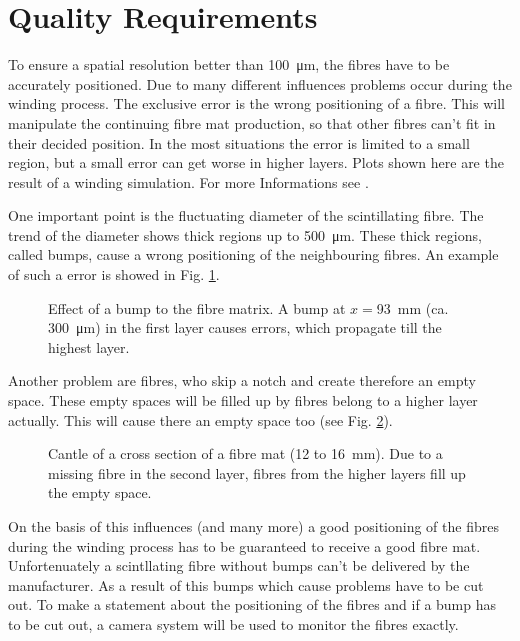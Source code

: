 \section{Quality Requirements}
\label{sec:QualityRequirements}

To ensure a spatial resolution better than \SI{100}{\micro\metre}, the fibres have to be accurately positioned. Due to many different influences problems occur during the winding process. The exclusive error is the wrong positioning of a fibre. This will manipulate the continuing fibre mat production, so that other fibres can't fit in their decided position. In the most situations the error is limited to a small region, but a small error can get worse in higher layers.
Plots shown here are the result of a winding simulation. For more Informations see \cite{WindingSimulation}.

One important point is the fluctuating diameter of the scintillating fibre. The trend of the diameter shows thick regions up to \SI{500}{\micro\metre}. These thick regions, called bumps, cause a wrong positioning of the neighbouring fibres. An example of such a error is showed in Fig. \ref{blob}.
\begin{figure}[tb]
\begin{center}
\caption[Effect of a bump to the fibre matrix.]{Effect of a bump to the fibre matrix. A bump at $x=$\SI{93}{\mm} (ca. \SI{300}{\micro\metre}) in the first layer causes errors, which propagate till the highest layer.\label{blob}}
\end{center}
\end{figure}

Another problem are fibres, who skip a notch and create therefore an empty space. These empty spaces will be filled up by fibres belong to a higher layer actually. This will cause there an empty space too (see Fig. \ref{missing}).
\begin{figure}[tb]
\begin{center}
\caption{Cantle of a cross section of a fibre mat (12 to \SI{16}{\mm}). Due to a missing fibre in the second layer, fibres from the higher layers fill up the empty space. \label{missing}}
\end{center}
\end{figure}

On the basis of this influences (and many more) a good positioning of the fibres during the winding process has to be guaranteed to receive a good fibre mat. Unfortenuately a scintllating fibre without bumps can't be delivered by the manufacturer. As a result of this bumps which cause problems have to be cut out. To make a statement about the positioning of the fibres and if a bump has to be cut out, a camera system will be used to monitor the fibres exactly.
